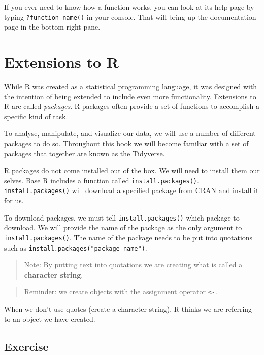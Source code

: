 \documentclass[
]{book}
\begin{document}
If you ever need to know how a function works, you can look at its help page by typing \texttt{?function\_name()} in your console. That will bring up the documentation page in the bottom right pane.

\hypertarget{extensions-to-r}{%
\section{Extensions to R}\label{extensions-to-r}}

While R was created as a statistical programming language, it was designed with the intention of being extended to include even more functionality. Extensions to R are called \emph{packages}. R packages often provide a set of functions to accomplish a specific kind of task.

To analyse, manipulate, and visualize our data, we will use a number of different packages to do so. Throughout this book we will become familiar with a set of packages that together are known as the \href{https://tidyverse.org}{Tidyverse}.

R packages do not come installed out of the box. We will need to install them our selves. Base R includes a function called \texttt{install.packages()}. \texttt{install.packages()} will download a specified package from CRAN and install it for us.

To download packages, we must tell \texttt{install.packages()} which package to download. We will provide the name of the package as the only argument to \texttt{install.packages()}. The name of the package needs to be put into quotations such as \texttt{install.packages("package-name")}.

\begin{quote}
Note: By putting text into quotations we are creating what is called a \textbf{character string}.
\end{quote}

\begin{quote}
Reminder: we create objects with the assignment operator \texttt{\textless{}-}.
\end{quote}

When we don't use quotes (create a character string), R thinks we are referring to an object we have created.

\hypertarget{exercise}{%
\subsection{Exercise}\label{exercise}}
\end{document}
